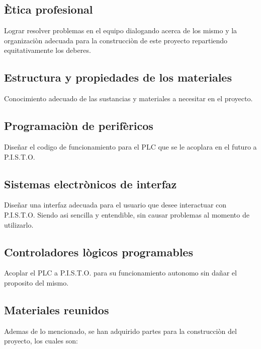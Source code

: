 \documentclass[12pt,a4paper]{article}
\begin{document}
\subsection{Ètica profesional}
Lograr resolver problemas en el equipo dialogando acerca de los mismo y la organizaciòn adecuada para la construcciòn de este proyecto repartiendo equitativamente los deberes.

\subsection{Estructura y propiedades de los materiales}
Conocimiento adecuado de las sustancias y materiales a necesitar en el proyecto.

\subsection{Programaciòn de perifèricos}
Diseñar el codigo de funcionamiento para el PLC que se le acoplara en el futuro a P.I.S.T.O.

\subsection{Sistemas electrònicos de interfaz}
Diseñar una interfaz adecuada para el usuario que desee interactuar con P.I.S.T.O. Siendo asi sencilla y entendible, sin causar problemas al momento de utilizarlo.

\subsection{Controladores lògicos programables}
Acoplar el PLC a P.I.S.T.O. para su funcionamiento autonomo sin dañar el proposito del mismo.\\

\subsection{Materiales reunidos}
Ademas de lo mencionado, se han adquirido partes para la construcciòn del proyecto, los cuales son:\\
\\
\newpage
\end{document}

